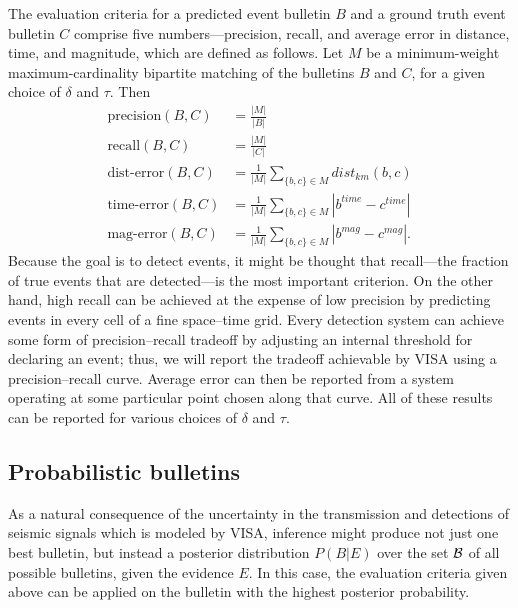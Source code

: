 \documentclass[a4paper,12pt]{article}
\begin{document}
The evaluation criteria for a predicted event bulletin $B$ and a ground
truth event bulletin $C$ comprise five numbers---precision,
recall, and average error in distance, time, and magnitude, which are defined as follows. Let $M$ be a
minimum-weight maximum-cardinality bipartite matching of the bulletins
$B$ and $C$, for a given choice of $\delta$ and $\tau$. Then 
\begin{align*}
\mbox{precision}(B,C) &= \frac{|M|}{|B|} \\
\mbox{recall}(B,C) &= \frac{|M|}{|C|} \\
\mbox{dist-error}(B,C) &= \frac{1}{|M|} \sum_{\{b,c\} \in M} dist_{km}(b,c) \\
\mbox{time-error}(B,C) &= \frac{1}{|M|}\sum_{\{b,c\} \in M} |b^{time} - c ^{time}| \\
\mbox{mag-error}(B,C) &= \frac{1}{|M|}\sum_{\{b,c\} \in M} |b^{mag} - c ^{mag}|.
\end{align*}
Because the goal is to detect events, it might be thought that
recall---the fraction of true events that are detected---is the most
important criterion. On the other hand, high recall can be achieved at
the expense of low precision by predicting events in every cell of a
fine space--time grid. Every detection system can achieve some form of
precision--recall tradeoff by adjusting an internal threshold for
declaring an event; thus, we will report the tradeoff achievable by
VISA using a precision--recall curve. Average error can then be
reported from a system operating at some particular point chosen along
that curve. All of these results can be reported for various choices of $\delta$ and $\tau$.

\subsection{Probabilistic bulletins}

As a natural consequence of the uncertainty in the transmission and
detections of seismic signals which is modeled by VISA, inference might
produce not just one best bulletin, but instead a posterior distribution $P(B|E)$ over
the set ${\cal B}$ of all possible bulletins, given the evidence $E$. 
In this case, the evaluation criteria given above can be applied on the bulletin
with the highest posterior probability.
\end{document}
